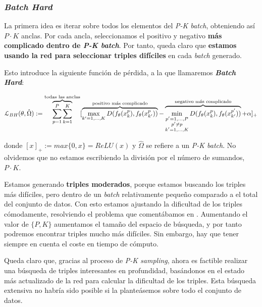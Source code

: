\subsubsection{\textit{Batch Hard}} \label{isubsubs:batch_hard}

La primera idea es iterar sobre todos los elementos del \textit{P-K batch}, obteniendo así $P \cdot K$ anclas. Por cada ancla, seleccionamos el positivo y negativo \textbf{más complicado dentro de \textit{P-K batch}}. Por tanto, queda claro que \textbf{estamos usando la red para seleccionar triples difíciles} en cada \textit{batch} generado.

Esto introduce la siguiente función de pérdida, a la que llamaremos \textbf{\textit{Batch Hard}}:

\begin{equation}
    \mathcal{L}_{BH}(\theta, \hat{\Omega}) := \overbrace{\sum_{p = 1}^P \sum_{k = 1}^K}^\textrm{\text{todas las anclas}} [
        \overbrace{\max_{k' = 1, \ldots, K} D(f_{\theta}(x_k^p), f_{\theta}(x_{k'}^p))}^\textrm{\text{positivo más complicado}}
        - \overbrace{\min_{\substack{p' = 1, \ldots, P \\ p' \neq p \\ k' = 1, \ldots, K}} D(f_{\theta}(x_k^p), f_{\theta}(x_{k'}^{p'}))}^\textrm{\text{negativo más complicado}}
        + \alpha]_+
\end{equation}

donde $[x]_+ := max \{0, x\} = ReLU(x)$ y $\hat{\Omega}$ se refiere a un \textit{P-K batch}. No olvidemos que no estamos escribiendo la división por el número de sumandos, $P \cdot K$.

Estamos generando \textbf{triples moderados}, porque estamos buscando los triples más difíciles, pero dentro de un \textit{batch} relativamente pequeño comparado a el total del conjunto de datos. Con esto estamos ajustando la dificultad de los triples cómodamente, resolviendo el problema que comentábamos en . Aumentando el valor de $\{P, K\}$ aumentamos el tamaño del espacio de búsqueda, y por tanto podremos encontrar triples mucho más difíciles. Sin embargo, hay que tener siempre en cuenta el coste en tiempo de cómputo.

Queda claro que, gracias al proceso de \textit{P-K sampling}, ahora es factible realizar una búsqueda de triples interesantes en profundidad, basándonos en el estado más actualizado de la red para calcular la dificultad de los triples. Esta búsqueda extensiva no habría sido posible si la planteásemos sobre todo el conjunto de datos.

